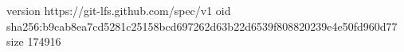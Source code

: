 version https://git-lfs.github.com/spec/v1
oid sha256:b9cab8ea7cd5281c25158bcd697262d63b22d6539f808820239e4e50fd960d77
size 174916
